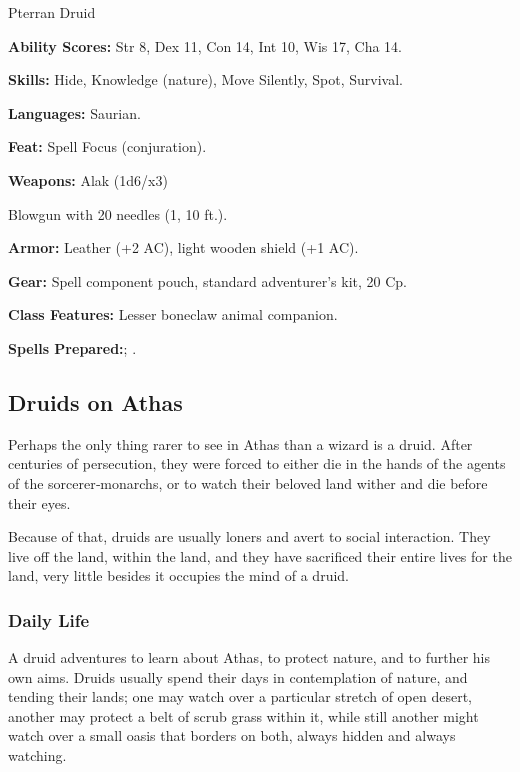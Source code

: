 Pterran Druid

\textbf{Ability Scores:} Str 8, Dex 11, Con 14, Int 10, Wis 17, Cha 14.

\textbf{Skills:} Hide, Knowledge (nature), Move Silently, Spot, Survival.

\textbf{Languages:} Saurian.

\textbf{Feat:} Spell Focus (conjuration).

\textbf{Weapons:} Alak (1d6/x3)

Blowgun with 20 needles (1, 10 ft.).

\textbf{Armor:} Leather (+2 AC), light wooden shield (+1 AC).

\textbf{Gear:} Spell component pouch, standard adventurer's kit, 20 Cp.

\textbf{Class Features:} Lesser boneclaw animal companion.

\textbf{Spells Prepared:}; .

\subsection{Druids on Athas}

Perhaps the only thing rarer to see in Athas than a wizard is a druid. After centuries of persecution, they were forced to either die in the hands of the agents of the sorcerer‐monarchs, or to watch their beloved land wither and die before their eyes.

Because of that, druids are usually loners and avert to social interaction. They live off the land, within the land, and they have sacrificed their entire lives for the land, very little besides it occupies the mind of a druid.

\subsubsection{Daily Life}

A druid adventures to learn about Athas, to protect nature, and to further his own aims. Druids usually spend their days in contemplation of nature, and tending their lands; one may watch over a particular stretch of open desert, another may protect a belt of scrub grass within it, while still another might watch over a small oasis that borders on both, always hidden and always watching.


